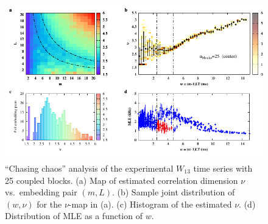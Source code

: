 \begin{appendices}
\begin{figure}[!htbp]
    \centering
    \includegraphics[width=\linewidth]{../blocks/25_blocks/middle/2e5_points/plots/chaos_low.pdf}
    \caption{``Chasing chaos'' analysis of the experimental $W_{13}$ time series with 25 coupled blocks.
    (a) Map of estimated correlation dimension $\nu$ vs.\ embedding pair $(m, L)$.
    (b) Sample joint distribution of $(w,\nu)$ for the $\nu$-map in (a).
    (c) Histogram of the estimated $\nu$. (d) Distribution of MLE as a function of $w$.
    } 
\end{figure}








\end{appendices}